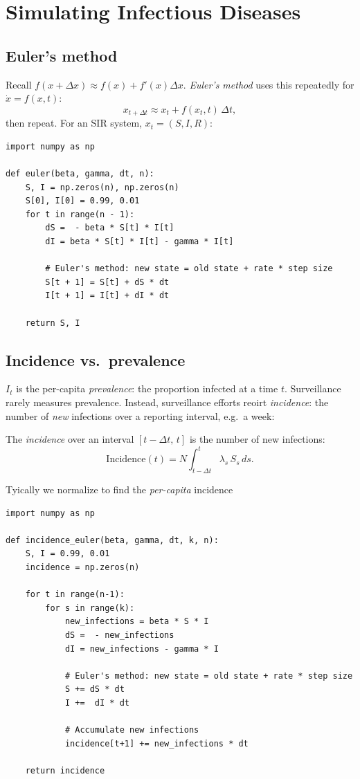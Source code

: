 \chapter{Simulating Infectious Diseases}

\section{Euler's method}

Recall $f(x+\Delta x) \approx f(x)+f'(x)\Delta x$. \emph{Euler's
method} uses this repeatedly for $\dot x = f(x,t)$:  
\[
x_{t+\Delta t} \approx x_t + f(x_t,t)\,\Delta t,
\]
then repeat. For an SIR system, $x_t = (S,I,R)$:
\begin{lstlisting}
import numpy as np

def euler(beta, gamma, dt, n):
    S, I = np.zeros(n), np.zeros(n)
    S[0], I[0] = 0.99, 0.01
    for t in range(n - 1):
        dS =  - beta * S[t] * I[t]
        dI = beta * S[t] * I[t] - gamma * I[t]

        # Euler's method: new state = old state + rate * step size
        S[t + 1] = S[t] + dS * dt
        I[t + 1] = I[t] + dI * dt
        
    return S, I
\end{lstlisting}

\section{Incidence vs.~prevalence}
$I_t$ is the per-capita \emph{prevalence}: the proportion infected at
a time $t$. Surveillance rarely measures prevalence. Instead,
surveillance efforts reoirt \emph{incidence}: the number of \emph{new}
infections over a reporting interval, e.g.\ a week:

\begin{definition}
The \emph{incidence} over an interval $[t-\Delta t,\,t]$ is the number
of new infections:
\[
\text{Incidence}(t) = N \int_{t-\Delta t}^{t} \lambda_s\, S_s \, ds.
\]
\end{definition}
Tyically we normalize to find the \emph{per-capita} incidence

\begin{lstlisting}
import numpy as np

def incidence_euler(beta, gamma, dt, k, n):
    S, I = 0.99, 0.01
    incidence = np.zeros(n)
 
    for t in range(n-1):
        for s in range(k):
            new_infections = beta * S * I
            dS =  - new_infections
            dI = new_infections - gamma * I

            # Euler's method: new state = old state + rate * step size
            S += dS * dt
            I +=  dI * dt

            # Accumulate new infections
            incidence[t+1] += new_infections * dt 
        
    return incidence
\end{lstlisting}

